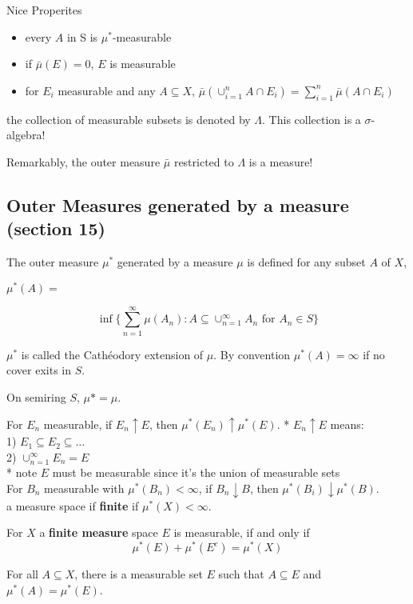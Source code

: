 \documentclass[a4paper, 12pt]{article}
\newcommand{\bt}[1]{\textbf{#1}} %
\newcommand{\tab}{\phantom{ssss}}
\begin{document}
\begin{multicols}{2}
Nice Properites
\begin{itemize}
    \item every $A$ in S is $\mu^*$-measurable
    \item if $\bar \mu(E) = 0$, $E$ is measurable
    \item for $E_i$ measurable and any $A \subseteq X$, 
    $\bar \mu(\cup_{i=1}^n A \cap E_i) = \sum_{i=1}^n \bar \mu(A \cap E_i)$
\end{itemize}

the collection of measurable subsets is denoted by $\Lambda$.
This collection is a $\sigma$-algebra! 

Remarkably, the outer measure $\bar \mu$ restricted to $\Lambda$ is a measure!


\subsection{Outer Measures generated by a measure (section 15)}
The outer measure $\mu^*$ generated by a measure $\mu$ is defined for any subset $A$ of $X$, 
\centerline{$\mu^*(A) =$}
$$\inf\{\sum_{n=1}^\infty \mu(A_n) : A \subseteq \cup_{n=1}^\infty A_n 
\text{ for $A_n \in S$}\}$$

$\mu^*$ is called the Cath\'eodory extension of $\mu$.
By convention $\mu^*(A) = \infty$ if no cover exits in $S$.

On semiring $S$, $\mu* = \mu$.


For $E_n$ measurable, if $E_n \uparrow E$, then $\mu^*(E_n) \uparrow \mu^*(E)$.
* $E_n \uparrow E$ means: \\
\tab \tab 1) $E_1 \subseteq E_2 \subseteq \dots$ \\
\tab \tab 2) $\cup_{n =1}^\infty E_n = E$ \\

* note $E$ must be measurable since it's the union of measurable sets \\

For $B_n$ measurable with $\mu^*(B_n) < \infty$, if $B_n \downarrow B$, then
$\mu^*(B_i) \downarrow \mu^*(B)$. \\

a measure space if \bt{finite} if $\mu^*(X) < \infty$.


For $X$ a \bt{finite measure} space $E$ is measurable, if and only if 
$$\mu^*(E) + \mu^*(E^c) = \mu^*(X)$$

For all $A \subseteq X$, there is a measurable set $E$ such that 
$A \subseteq E$ and $\mu^*(A) = \mu^*(E)$.



\end{multicols}
\end{document}
